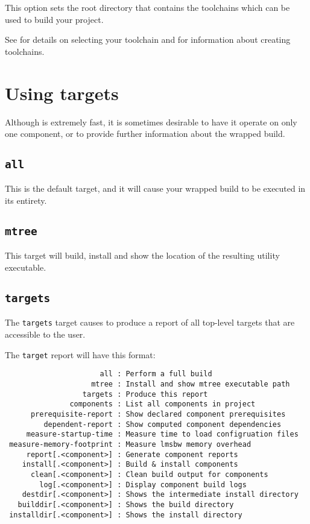 This option sets the root directory that contains the toolchains which
can be used to build your project.

See  for details on selecting your
toolchain and  for information
about creating toolchains.

\section{Using \lmsbw targets}\label{lmsbw:target:verbs}

Although \lmsbw is extremely fast, it is sometimes desirable to have
it operate on only one component, or to provide further information
about the wrapped build.

\subsection{\texttt{all}}\label{lmsbw:target:all}

This is the default target, and it will cause your wrapped build to be
executed in its entirety.

\subsection{\texttt{mtree}}

This target will build, install and show the location of the resulting
\mtree utility executable.

\subsection{\texttt{targets}}

The \texttt{targets} target causes \lmsbw to produce a report of all
top-level targets that are accessible to the user.

The \texttt{target} report will have this format:

\begin{small}
\begin{verbatim}
                      all : Perform a full build
                    mtree : Install and show mtree executable path
                  targets : Produce this report
               components : List all components in project
      prerequisite-report : Show declared component prerequisites
         dependent-report : Show computed component dependencies
     measure-startup-time : Measure time to load configruation files
 measure-memory-footprint : Measure lmsbw memory overhead
     report[.<component>] : Generate component reports
    install[.<component>] : Build & install components
      clean[.<component>] : Clean build output for components
        log[.<component>] : Display component build logs
    destdir[.<component>] : Shows the intermediate install directory
   builddir[.<component>] : Shows the build directory
 installdir[.<component>] : Shows the install directory
\end{verbatim}
\end{small}

